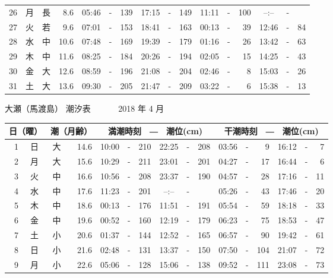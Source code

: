 \documentclass[12pt.a4j]{jsarticle}
\begin{document}
\begin{center}
\begin{table}[ht]
\begin{tabular}{|rc|cr|ccrccr|ccrccr|}
26 & 月 & 長 &  8.6 &  05:46 &-& 139  &  17:15 &-& 149  &   11:11 &-& 100  &   --:-- &-&     \\
27 & 火 & 若 &  9.6 &  07:01 &-& 153  &  18:41 &-& 163  &   00:13 &-&  39  &   12:46 &-&  84  \\
28 & 水 & 中 & 10.6 &  07:48 &-& 169  &  19:39 &-& 179  &   01:16 &-&  26  &   13:42 &-&  63  \\
29 & 木 & 中 & 11.6 &  08:25 &-& 184  &  20:26 &-& 194  &   02:05 &-&  15  &   14:25 &-&  43  \\
30 & 金 & 大 & 12.6 &  08:59 &-& 196  &  21:08 &-& 204  &   02:46 &-&   8  &   15:03 &-&  26  \\
31 & 土 & 大 & 13.6 &  09:30 &-& 205  &  21:47 &-& 209  &   03:22 &-&   6  &   15:38 &-&  13  \\
   \hline
   \end{tabular}
\end{table}
\newpage
 {\LARGE 大瀬（馬渡島）  潮汐表　　　}
 {\large 2018 年  4 月}\\
 \begin{table}[ht]
    \begin{tabular}{|rc|cr|ccrccr|ccrccr|}
    \hline
    \multicolumn{2}{|c|}{日（曜）} & \multicolumn{2}{c|}{潮（月齢）} & \multicolumn{6}{c|}{満潮時刻　―　潮位(cm)} & \multicolumn{6}{c|}{干潮時刻　―　潮位(cm)} \\
 \hline
 1 & 日 & 大 & 14.6 &  10:00 &-& 210  &  22:25 &-& 208  &   03:56 &-&   9  &   16:12 &-&   7  \\
 2 & 月 & 大 & 15.6 &  10:29 &-& 211  &  23:01 &-& 201  &   04:27 &-&  17  &   16:44 &-&   6  \\
 3 & 火 & 中 & 16.6 &  10:56 &-& 208  &  23:37 &-& 190  &   04:57 &-&  28  &   17:16 &-&  11  \\
 4 & 水 & 中 & 17.6 &  11:23 &-& 201  &  --:-- &-&     &   05:26 &-&  43  &   17:46 &-&  20  \\
 5 & 木 & 中 & 18.6 &  00:13 &-& 176  &  11:51 &-& 191  &   05:54 &-&  59  &   18:18 &-&  33  \\
 6 & 金 & 中 & 19.6 &  00:52 &-& 160  &  12:19 &-& 179  &   06:23 &-&  75  &   18:53 &-&  47  \\
 7 & 土 & 小 & 20.6 &  01:37 &-& 144  &  12:52 &-& 165  &   06:57 &-&  90  &   19:42 &-&  61  \\
 8 & 日 & 小 & 21.6 &  02:48 &-& 131  &  13:37 &-& 150  &   07:50 &-& 104  &   21:07 &-&  72  \\
 9 & 月 & 小 & 22.6 &  05:06 &-& 128  &  15:06 &-& 138  &   09:52 &-& 111  &   23:08 &-&  73  \\

\end{tabular}
\end{table}
\end{center}
\end{document}
